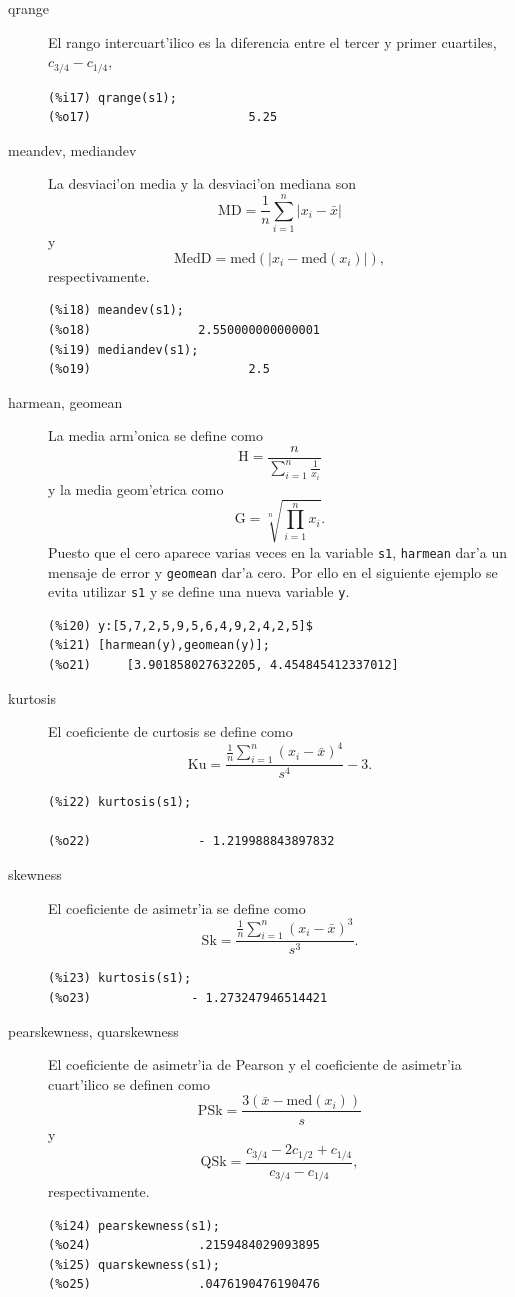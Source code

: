 \documentclass[spanish,12pt,a4paper]{article}
\begin{document}
\begin{description}
\item[qrange] El rango intercuart'ilico es la diferencia entre el tercer y primer cuartiles, $c_{3/4}-c_{1/4}$,
\begin{verbatim}
(%i17) qrange(s1);
(%o17)                      5.25
\end{verbatim}

\item[meandev, mediandev] La desviaci'on media y la desviaci'on mediana son
\[
\mbox{MD}= \frac{1}{n} \sum_{i=1}^n |x_i-\bar{x}|
\]
y
\[
\mbox{MedD}=\mbox{med}(|x_i-\mbox{med}(x_i)|),
\]
respectivamente.
\begin{verbatim}
(%i18) meandev(s1);
(%o18)               2.550000000000001
(%i19) mediandev(s1);
(%o19)                      2.5
\end{verbatim}

\item[harmean, geomean] La media arm'onica se define como
\[
\mbox{H} = \frac{n}{\sum_{i=1}^n \frac{1}{x_i}}
\]
y la media geom'etrica como
\[
\mbox{G} = \sqrt[n]{\prod_{i=1}^n x_i}.
\]
Puesto que el cero aparece varias veces en la variable \verb|s1|, \verb|harmean| dar'a un mensaje de error y \verb|geomean| dar'a cero. Por ello en el siguiente ejemplo se evita utilizar \verb|s1| y se define una nueva variable \verb|y|.
\begin{verbatim}
(%i20) y:[5,7,2,5,9,5,6,4,9,2,4,2,5]$
(%i21) [harmean(y),geomean(y)];
(%o21)     [3.901858027632205, 4.454845412337012]
\end{verbatim}

\item[kurtosis] El coeficiente de curtosis se define como
\[
\mbox{Ku}=\frac{\frac{1}{n} \sum_{i=1}^n (x_i-\bar{x})^4}{s^4} -3.
\]
\begin{verbatim}
(%i22) kurtosis(s1);

(%o22)               - 1.219988843897832
\end{verbatim}


\item[skewness] El coeficiente de asimetr'ia se define como
\[
\mbox{Sk}=\frac{\frac{1}{n} \sum_{i=1}^n (x_i-\bar{x})^3}{s^3}.
\]
\begin{verbatim}
(%i23) kurtosis(s1);
(%o23)              - 1.273247946514421
\end{verbatim}

\item[pearskewness, quarskewness] El coeficiente de asimetr'ia de Pearson y el coeficiente de asimetr'ia cuart'ilico se definen como 
\[
\mbox{PSk}= \frac{3 (\bar{x}-\mbox{med}(x_i))}{s}
\]
y
\[
\mbox{QSk}= \frac{c_{3/4}-2 c_{1/2}+c_{1/4}}{c_{3/4}-c_{1/4}},
\]
respectivamente.
\begin{verbatim}
(%i24) pearskewness(s1);
(%o24)               .2159484029093895
(%i25) quarskewness(s1);
(%o25)               .0476190476190476
\end{verbatim}

\end{description}
\end{document}
